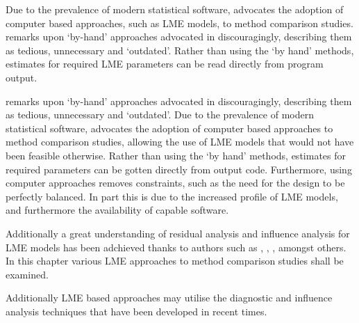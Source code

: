 \documentclass[12pt, a4paper]{report}
\theoremstyle{plain}
\theoremstyle{definition}
\theoremstyle{remark}
\begin{document}
Due to the prevalence of modern statistical software, \citet{BXC2008} advocates the adoption of computer based approaches, such as LME models, to method comparison studies. \citet{BXC2008} remarks upon `by-hand' approaches advocated in \citet{BA99} discouragingly, describing them as tedious, unnecessary and `outdated'. Rather than using the `by hand' methods, estimates for required LME parameters can be read directly from program output.

\citet{BXC2008} remarks upon `by-hand' approaches advocated in \citet{BA99} discouragingly, describing them as tedious, unnecessary and `outdated'. Due to the prevalence of modern statistical software, \citet{BXC2008} advocates the adoption of computer based approaches to method comparison studies, allowing the use of LME models that would not have been feasible otherwise. Rather than using the `by hand' methods, estimates for required parameters can be gotten directly from output code. Furthermore, using computer approaches removes constraints, such as the need for the design to be perfectly balanced.
In part this is due to the increased profile of LME models, and furthermore the availability of capable software.  

Additionally a great understanding of residual analysis and influence analysis for LME models has been adchieved thanks to authors such as \citet{schab}, \citet{CPJ}, \citet{cook86} \citet{west}, amongst others. In this chapter various LME approaches to method comparison studies shall
be examined. 

Additionally LME based approaches may utilise the diagnostic and influence analysis techniques that have been developed in recent times.


%
%
%
%
\end{document}

